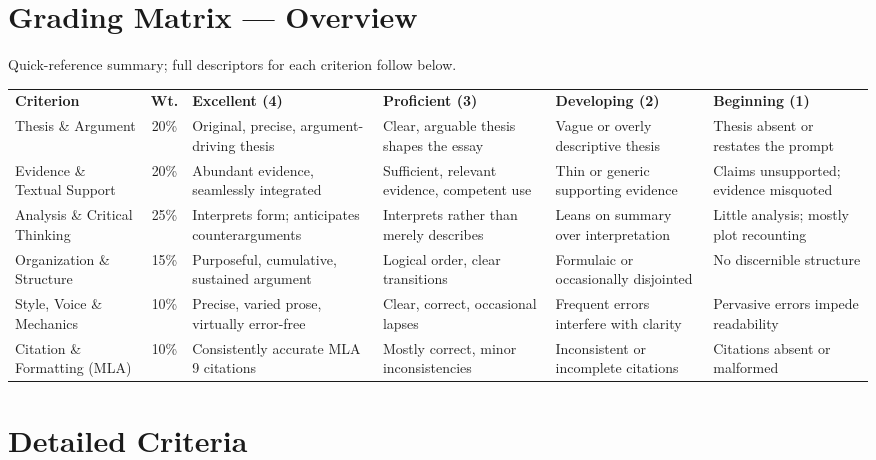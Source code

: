 \documentclass[11pt,a4paper]{scrartcl}
\begin{document}
\section*{Grading Matrix --- Overview}
\small\color{slate} Quick-reference summary; full descriptors for each criterion follow below.\par
\vspace{2mm}
\begin{footnotesize}
\begin{tabularx}{\linewidth}{@{}p{2.3cm} c X X X X@{}}
\rowcolor{inkblue}
\color{white}\bfseries Criterion & \color{white}\bfseries Wt. & \color{white}\bfseries Excellent (4) & \color{white}\bfseries Proficient (3) & \color{white}\bfseries Developing (2) & \color{white}\bfseries Beginning (1) \\
Thesis \& Argument & 20\% & Original, precise, argument-driving thesis & Clear, arguable thesis shapes the essay & Vague or overly descriptive thesis & Thesis absent or restates the prompt \\
\rowcolor{paper}
Evidence \& Textual Support & 20\% & Abundant evidence, seamlessly integrated & Sufficient, relevant evidence, competent use & Thin or generic supporting evidence & Claims unsupported; evidence misquoted \\
Analysis \& Critical Thinking & 25\% & Interprets form; anticipates counterarguments & Interprets rather than merely describes & Leans on summary over interpretation & Little analysis; mostly plot recounting \\
\rowcolor{paper}
Organization \& Structure & 15\% & Purposeful, cumulative, sustained argument & Logical order, clear transitions & Formulaic or occasionally disjointed & No discernible structure \\
Style, Voice \& Mechanics & 10\% & Precise, varied prose, virtually error-free & Clear, correct, occasional lapses & Frequent errors interfere with clarity & Pervasive errors impede readability \\
\rowcolor{paper}
Citation \& Formatting (MLA) & 10\% & Consistently accurate MLA\,9 citations & Mostly correct, minor inconsistencies & Inconsistent or incomplete citations & Citations absent or malformed \\
\end{tabularx}
\end{footnotesize}

\vspace{6mm}

\section*{Detailed Criteria}
\end{document}
